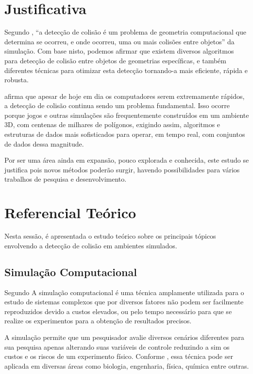 \section{Justificativa}

Segundo , “a detecção de colisão é um problema de geometria computacional que determina se ocorreu, e onde ocorreu, uma ou mais colisões entre objetos” da simulação. Com base nisto, podemos afirmar que existem diversos algoritmos para detecção de colisão entre objetos de geometrias específicas, e também diferentes técnicas para otimizar esta detecção tornando-a mais eficiente, rápida e robusta.

 afirma que apesar de hoje em dia os computadores serem extremamente rápidos, a detecção de colisão continua sendo um problema fundamental. Isso ocorre porque jogos e outras simulações são frequentemente construídos em um ambiente 3D, com centenas de milhares de polígonos, exigindo assim, algoritmos e estruturas de dados mais sofisticados para operar, em tempo real, com conjuntos de dados dessa magnitude.

Por ser uma área ainda em expansão, pouco explorada e conhecida, este estudo se justifica pois novos métodos poderão surgir, havendo possibilidades para vários trabalhos de pesquisa e desenvolvimento.

\section{Referencial Teórico}

Nesta sessão, é apresentada o estudo teórico sobre os principais tópicos envolvendo a detecção de colisão em ambientes simulados.

\subsection{Simulação Computacional}

Segundo  A simulação computacional é uma técnica amplamente utilizada para o estudo de
sistemas complexos que por diversos fatores não podem ser facilmente
reproduzidos devido a custos elevados, ou pelo tempo necessário para que se
realize os experimentos para a obtenção de resultados precisos.

A simulação permite que um pesquisador avalie diversos cenários diferentes para sua
pesquisa apenas alterando suas variáveis de controle reduzindo a sim os custos
e os riscos de um experimento físico. Conforme , essa técnica pode ser aplicada em
diversas áreas como biologia, engenharia, física, química entre outras.

